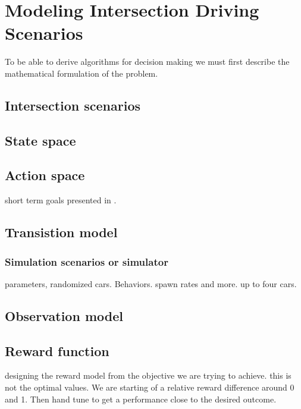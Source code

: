 \chapter{Modeling Intersection Driving Scenarios}
\label{ch:modeling_intersection}
To be able to derive algorithms for decision making we must first describe the mathematical formulation of the problem.  

\section{Intersection scenarios}

\section{State space}

\section{Action space}
short term goals presented in \paperLSTM.

\section{Transistion model}

\subsection{Simulation scenarios or simulator}
parameters, randomized cars. Behaviors. spawn rates and more. up to four cars. 

\section{Observation model}

\section{Reward function}
designing the reward model from the objective we are trying to achieve. this is not the optimal values. We are starting of a relative reward difference around 0 and 1. Then hand tune to get a performance close to the desired outcome. 

